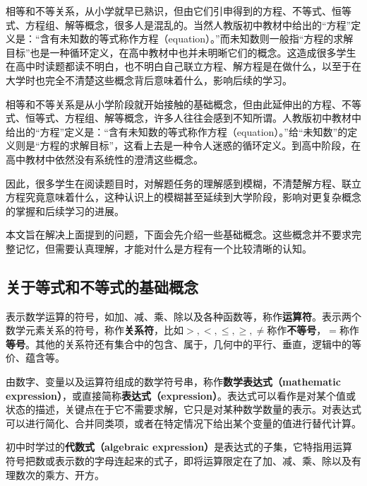 
\begin{issues}
\issueDraft
\end{issues}

相等和不等关系，从小学就早已熟识，但由它们引申得到的方程、不等式、恒等式、方程组、解等概念，很多人是混乱的。当然人教版初中教材中给出的“方程”定义是：“含有未知数的等式称作方程（equation）。”而未知数则一般指“方程的求解目标”也是一种循环定义，在高中教材中也并未明晰它们的概念。这造成很多学生在高中时读题都读不明白，也不明白自己联立方程、解方程是在做什么，以至于在大学时也完全不清楚这些概念背后意味着什么，影响后续的学习。

相等和不等关系是从小学阶段就开始接触的基础概念，但由此延伸出的方程、不等式、恒等式、方程组、解等概念，许多人往往会感到不知所谓。人教版初中教材中给出的“方程”定义是：“含有未知数的等式称作方程（equation）。”给“未知数”的定义则是“方程的求解目标”，这看上去是一种令人迷惑的循环定义。到高中阶段，在高中教材中依然没有系统性的澄清这些概念。

因此，很多学生在阅读题目时，对解题任务的理解感到模糊，不清楚解方程、联立方程究竟意味着什么，这种认识上的模糊甚至延续到大学阶段，影响对更复杂概念的掌握和后续学习的进展。


本文旨在解决上面提到的问题，下面会先介绍一些基础概念。这些概念并不要求完整记忆，但需要认真理解，才能对什么是方程有一个比较清晰的认知。

\subsection{关于等式和不等式的基础概念}



表示数学运算的符号，如加、减、乘、除以及各种函数等，称作\textbf{运算符}。表示两个数学元素关系的符号，称作\textbf{关系符}，比如$>,<,\leq,\geq,\neq$称作\textbf{不等号}，$=$称作\textbf{等号}。其他的关系符还有集合中的包含、属于，几何中的平行、垂直，逻辑中的等价、蕴含等。

由数字、变量以及运算符组成的数学符号串，称作\textbf{数学表达式（mathematic expression）}，或直接简称\textbf{表达式（expression）}。表达式可以看作是对某个值或状态的描述，关键点在于它不需要求解，它只是对某种数学数量的表示。对表达式可以进行简化、合并同类项，或者在特定情况下给出某个变量的值进行替代计算。

初中时学过的\textbf{代数式（algebraic expression）}是表达式的子集，它特指用运算符号把数或表示数的字母连起来的式子，即将运算限定在了加、减、乘、除以及有理数次的乘方、开方。

